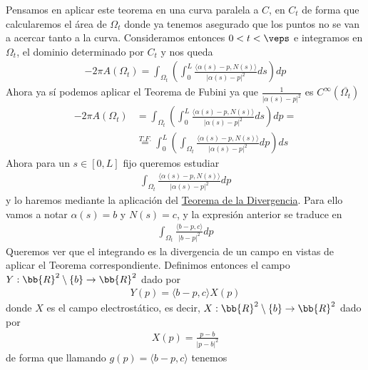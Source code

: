 \begin{observacion}
\begin{enumerate}[start=4]
        Pensamos en aplicar este teorema en una curva paralela a $C$, en $C_t$ de forma que calcularemos el área de $\Omega_t$ donde ya tenemos asegurado que los puntos no se van a acercar tanto a la curva. Consideramos entonces $0<t<\veps$ e integramos en $\Omega_t$, el dominio determinado por $C_t$ y nos queda
        \begin{gather*}
            -2\pi A(\Omega_t) = \int_{\Omega_t} \left(\int_0^L \frac{\langle \alpha(s) - p, N(s) \rangle}{|\alpha(s) - p|^2} ds \right) dp
        \end{gather*}
        Ahora ya sí podemos aplicar el Teorema de Fubini ya que $\frac{1}{|\alpha(s) - p|^2}$ es $C^\infty(\overline{\Omega_t})$
        \begin{align*}
            -2\pi A(\Omega_t) &= 
            \int_{\Omega_t} \left(\int_0^L \frac{\langle \alpha(s) - p, N(s) \rangle}{|\alpha(s) - p|^2} ds \right) dp = \\
            &\overset{T.F.}{=}
            \int_0^L \left(\int_{\Omega_t} \frac{\langle \alpha(s) - p, N(s) \rangle}{|\alpha(s) - p|^2} dp \right) ds
        \end{align*}
        Ahora para un $s\in [0,L]$ fijo queremos estudiar
        \begin{gather*}
            \int_{\Omega_t} \frac{\langle \alpha(s) - p, N(s) \rangle}{|\alpha(s) - p|^2} dp
        \end{gather*}
        y lo haremos mediante la aplicación del \hyperref[teo:divergencia]{Teorema de la Divergencia}. Para ello vamos a notar $\alpha(s)=b$ y $N(s)=c$, y la expresión anterior se traduce en
        \begin{gather*}
            \int_{\Omega_t} \frac{\langle b - p, c \rangle}{|b - p|^2} dp
        \end{gather*}
        Queremos ver que el integrando es la divergencia de un campo en vistas de aplicar el Teorema correspondiente. Definimos entonces el campo $Y:\bb{R}^2\setminus\{b\} \to \bb{R}^2$ dado por 
        \begin{gather*}
            Y(p) = \langle b-p, c \rangle X(p)
        \end{gather*}
        donde $X$ es el campo electrostático, es decir, $X:\bb{R}^2\setminus\{b\} \to \bb{R}^2$ dado por
        \begin{gather*}
            X(p) = \frac{p-b}{|p-b|^2}
        \end{gather*}
        de forma que llamando $g(p)=\langle b-p, c \rangle$ tenemos
        \begin{gather*}

\end{gather*}
\end{enumerate}
\end{observacion}
